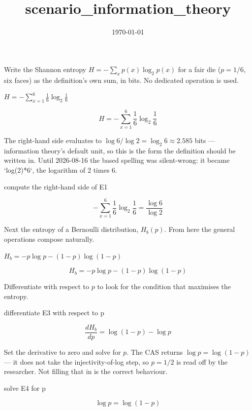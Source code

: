 \documentclass[dvipdfmx]{article}
\title{scenario\_information\_theory}
\date{\today}
\begin{document}
\maketitle

Write the Shannon entropy $H=-\sum_x p(x)\log_2 p(x)$ for a fair die ($p=1/6$, six faces) as the definition's own sum, in bits. No dedicated operation is used.

$H = -\sum_{x=1}^{6} \frac{1}{6}\log_2 \frac{1}{6}$

\begin{equation}
  H = -\sum_{x=1}^{6} \frac{1}{6}\log_2 \frac{1}{6}
  \label{eq:E1}
\end{equation}

The right-hand side evaluates to $\log 6/\log 2 = \log_2 6 \approx 2.585$ bits — information theory's default unit, so this is the form the definition should be written in. Until 2026-08-16 the based spelling was silent-wrong: it became `log(2)*6`, the logarithm of 2 times 6.

compute the right-hand side of E1

\begin{equation}
  -\sum_{x=1}^{6} \frac{1}{6}\log_2 \frac{1}{6} = \frac{\log 6}{\log 2}
  \label{eq:E2}
\end{equation}

Next the entropy of a Bernoulli distribution, $H_b(p)$. From here the general operations compose naturally.

$H_b = -p\log p - (1-p)\log(1-p)$

\begin{equation}
  H_b = -p\log p - (1-p)\log(1-p)
  \label{eq:E3}
\end{equation}

Differentiate with respect to $p$ to look for the condition that maximises the entropy.

differentiate E3 with respect to p

\begin{equation}
  \frac{dH_b}{dp} = \log \left(1-p\right)-\log p
  \label{eq:E4}
\end{equation}

Set the derivative to zero and solve for $p$. The CAS returns $\log p=\log(1-p)$ — it does not take the injectivity-of-log step, so $p=1/2$ is read off by the researcher. Not filling that in is the correct behaviour.

solve E4 for p

\begin{equation}
  \log p = \log \left(1-p\right)
  \label{eq:E5}
\end{equation}
\end{document}
